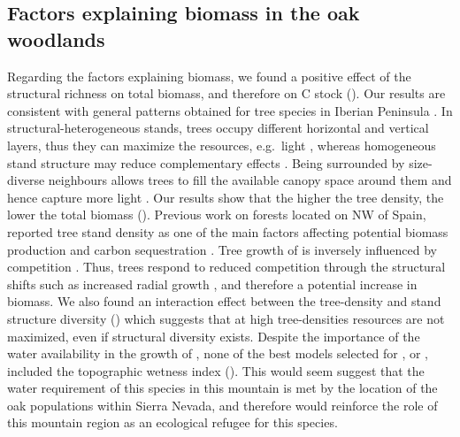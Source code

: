 \subsection{Factors explaining biomass in the oak woodlands}\label{sec:carbon:discussion-factors}
Regarding the factors explaining biomass, we found a positive effect of the structural richness on total biomass, and therefore on C stock (). Our results are consistent with general patterns obtained for tree species in Iberian Peninsula \autocite{Vayredaetal2012SpatialPatterns}. In structural-heterogeneous stands, trees occupy different horizontal and vertical layers, thus they can maximize the resources, e.g.~light \autocite{Forrester2014StandlevelLight}, whereas homogeneous stand structure may reduce complementary effects \autocite{Goncalves2018EffectsForest,Vayredaetal2012SpatialPatterns}. Being surrounded by size-diverse neighbours allows trees to fill the available canopy space around them and hence capture more light \autocite{Forrester2014StandlevelLight,Vanhellemontetal2018SpeciesStructural}. Our results show that the higher the tree density, the lower the total biomass ().
Previous work on forests located on NW of Spain, reported tree stand density as one of the main factors affecting potential biomass production and carbon sequestration \autocite{CastanoSantamariaetal2013PotentialGround}. Tree growth of \Qp is inversely influenced by competition \autocite{Canellasetal2004GrowthResponse,FernandezdeUnaetal2015StandCompetition,FernandezdeUnaetal2016DisentanglingEffect}. Thus, trees respond to reduced competition through the structural shifts such as increased radial growth \autocite{Canellasetal2004GrowthResponse,FernandezdeUnaetal2016DisentanglingEffect}, and therefore a potential increase in biomass. We also found an interaction effect between the tree-density and stand structure diversity () which suggests that at high tree-densities resources are not maximized, even if structural diversity exists.
Despite the importance of the water availability in the growth of \Qp \autocite{GeaIzquierdoCanellas2014LocalClimate,MorenoFernandezetal2020InfluenceClimate}, none of the best models selected for \wt, \ws or \wro, included the topographic wetness index (). This would seem suggest that the water requirement of this species in this mountain is met by the location of the oak populations within Sierra Nevada, and therefore would reinforce the role of this mountain region as an ecological refugee for this species.

